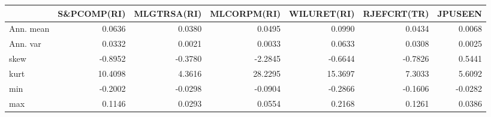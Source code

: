 \begin{tabular}{lrrrrrr}
\toprule
{} &  S\&PCOMP(RI) &  MLGTRSA(RI) &  MLCORPM(RI) &  WILURET(RI) &  RJEFCRT(TR) &  JPUSEEN \\
\midrule
Ann. mean &       0.0636 &       0.0380 &       0.0495 &       0.0990 &       0.0434 &   0.0068 \\
Ann. var  &       0.0332 &       0.0021 &       0.0033 &       0.0633 &       0.0308 &   0.0025 \\
skew      &      -0.8952 &      -0.3780 &      -2.2845 &      -0.6644 &      -0.7826 &   0.5441 \\
kurt      &      10.4098 &       4.3616 &      28.2295 &      15.3697 &       7.3033 &   5.6092 \\
min       &      -0.2002 &      -0.0298 &      -0.0904 &      -0.2866 &      -0.1606 &  -0.0282 \\
max       &       0.1146 &       0.0293 &       0.0554 &       0.2168 &       0.1261 &   0.0386 \\
\bottomrule
\end{tabular}
